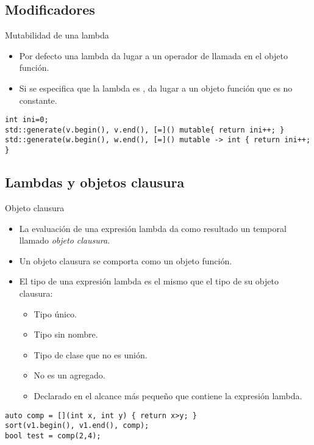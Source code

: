 \subsection{Modificadores}

\begin{frame}[t,fragile]{Mutabilidad de una lambda}
  \begin{itemize}
    \item Por defecto una lambda da lugar a un operador de llamada  en el objeto función.
    \item Si se especifica que la lambda es , da lugar a un objeto función que es no constante.
  \end{itemize}
\begin{lstlisting}
int ini=0;
std::generate(v.begin(), v.end(), [=]() mutable{ return ini++; }
std::generate(w.begin(), w.end(), [=]() mutable -> int { return ini++; }
\end{lstlisting}
\end{frame}

\subsection{Lambdas y objetos clausura}

\begin{frame}[t,fragile]{Objeto clausura}
  \begin{itemize}
    \item La evaluación de una expresión lambda da como resultado un temporal llamado \emph{objeto clausura}.
    \item Un objeto clausura se comporta como un objeto función.
    \item El tipo de una expresión lambda es el mismo que el tipo de su objeto clausura:
      \begin{itemize}
        \item Tipo único.
        \item Tipo sin nombre.
        \item Tipo de clase que no es unión.
        \item No es un agregado.
        \item Declarado en el alcance más pequeño que contiene la expresión lambda.
      \end{itemize}
  \end{itemize}
\begin{lstlisting}
auto comp = [](int x, int y) { return x>y; }
sort(v1.begin(), v1.end(), comp);
bool test = comp(2,4);
\end{lstlisting}
\end{frame}

